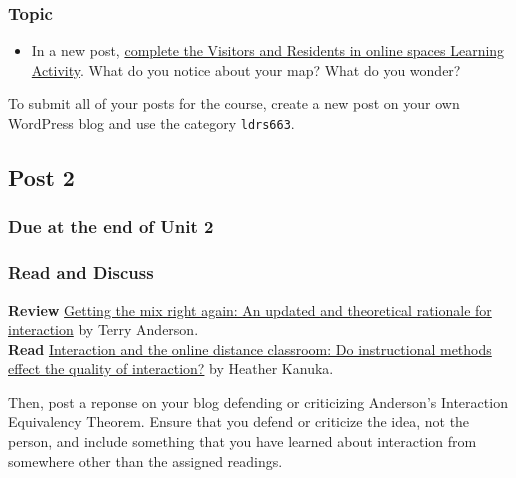\documentclass[
]{book}
\providecommand{\tightlist}{%
  \setlength{\itemsep}{0pt}\setlength{\parskip}{0pt}}
\begin{document}
\hypertarget{topic}{%
\subsubsection*{Topic}\label{topic}}

\begin{itemize}
\tightlist
\item
  In a new post, \href{https://ma-lead.github.io/ldrs663/building-the-web.html\#learning-activity}{complete the Visitors and Residents in online spaces Learning Activity}. What do you notice about your map? What do you wonder?
\end{itemize}

To submit all of your posts for the course, create a new post on your own WordPress blog and use the category \texttt{ldrs663}.

\hypertarget{post-2}{%
\subsection*{Post 2}\label{post-2}}

\hypertarget{due-at-the-end-of-unit-2}{%
\subsubsection*{Due at the end of Unit 2}\label{due-at-the-end-of-unit-2}}

\hypertarget{read-and-discuss}{%
\subsubsection*{Read and Discuss}\label{read-and-discuss}}

\textbf{Review} \href{https://www.irrodl.org/index.php/irrodl/article/view/149/230}{Getting the mix right again: An updated and theoretical rationale for interaction} by Terry Anderson.\\
\textbf{Read} \href{https://link-springer-com.ezproxy.student.twu.ca/article/10.1007/s12528-011-9049-4}{Interaction and the online distance classroom: Do instructional methods effect the quality of interaction?} by Heather Kanuka.

Then, post a reponse on your blog defending or criticizing Anderson's Interaction Equivalency Theorem. Ensure that you defend or criticize the idea, not the person, and include something that you have learned about interaction from somewhere other than the assigned readings.
\end{document}
